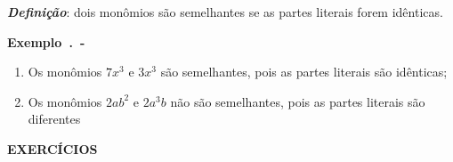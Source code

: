 \setlength{\parskip}{.5em}

\textbf{\textit{Definição}}: dois monômios são semelhantes se as partes literais forem idênticas.

\newpage

\textbf{Exemplo~\thesubsection.\theexemplo~-}
\settowidth{}
\begin{description}[leftmargin=\dimexpr\widest+\labelsep\relax,labelindent=0pt,
    labelwidth=\widest]
\item
\begin{enumerate}[label=(\textbf{\alph*)}]
    \item Os monômios $7x^3$ e $3x^3$ são semelhantes, pois as partes literais são idênticas;
    
    \item Os monômios  $2ab^2$ e $2a^3b$ não são semelhantes, pois as partes literais são diferentes \qedsymbol
\end{enumerate}

\end{description}

\noindent\textbf{EXERCÍCIOS \thesubsection}

